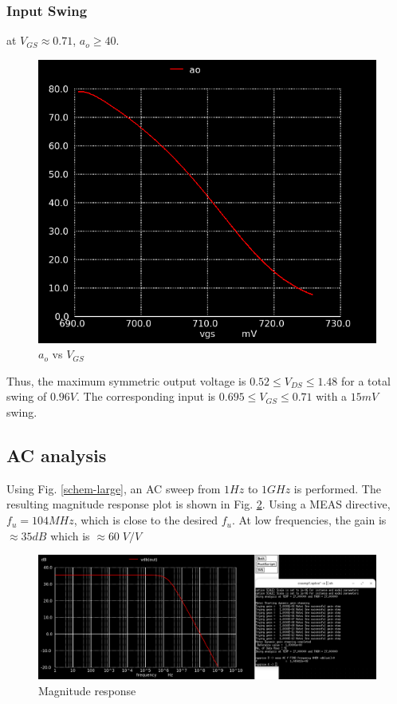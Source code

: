 \documentclass[conference]{IEEEtran}
\begin{document}
\subsubsection{Input Swing}
at $V_{GS}\approx 0.71$, $a_o \geq 40$. 
\begin{figure}[H]
	\centering 
	\includegraphics[scale=0.3]{ao-vgs.png}
	\caption{$a_o$ vs $V_{GS}$}
	\label{swing-in}
\end{figure}
Thus, the maximum symmetric output voltage is $0.52 \leq V_{DS} \leq 1.48$ for a total swing of $0.96V$. The corresponding input is $0.695 \leq V_{GS} \leq 0.71$ with a $15mV$ swing.

\subsection{AC analysis}
Using Fig. \ref{schem-large}, an AC sweep from $1 Hz$ to $1GHz$ is performed. The resulting magnitude response plot is shown in Fig. \ref{vdb}. Using a MEAS directive, $f_u=104MHz$, which is close to the desired $f_u$. At low frequencies, the gain is $\approx 35dB$
which is $\approx 60\; V/V$
\begin{figure}[H]
	\centering 
	\includegraphics[width=\columnwidth]{vdb.png}
	\caption{Magnitude response}
	\label{vdb}
\end{figure}
\end{document}
